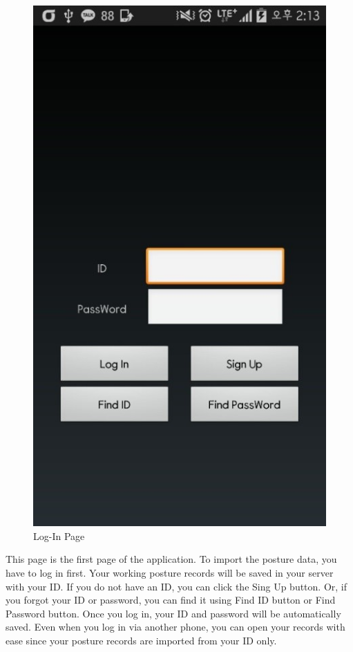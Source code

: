 \documentclass[conference]{IEEEtran}
\begin{document}
\begin{figure}[h]
\begin{center}
    \includegraphics[scale=1]{img_10}
    \caption{Log-In Page} 
\end{center}
\end{figure}

 This page is the first page of the application. To import the posture data, you have to log in first. Your working posture records will be saved in your server with your ID. If you do not have an ID, you can click the Sing Up  button. Or, if you forgot your ID or password, you can find it using Find ID button or Find Password button. Once you log in, your ID and password will be automatically saved. Even when you log in via another phone, you can  open your records with ease since your posture records are imported from your ID only.\\
\end{document}
